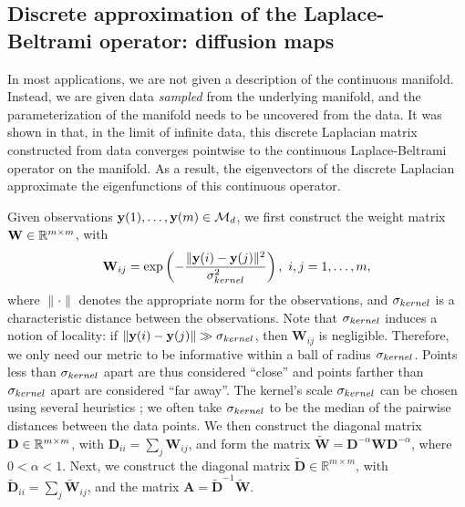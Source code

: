 \subsection{Discrete approximation of the Laplace-Beltrami operator: diffusion maps} \label{sec:dmaps}

In most applications, we are not given a description of the continuous manifold.
%
Instead, we are given data {\em sampled} from the underlying manifold, and the parameterization of the manifold needs to be uncovered from the data.
%
It was shown in \cite{coifman2006geometric} that, in the limit of infinite data, this discrete Laplacian matrix constructed from data converges pointwise to the continuous Laplace-Beltrami operator on the manifold.
%
As a result, the eigenvectors of the discrete Laplacian approximate the eigenfunctions of this continuous operator.

Given observations $\mathbf{y}(1), \dots, \mathbf{y}(m) \in \mathcal{M}_d$, we first construct the weight matrix $\mathbf{W} \in \mathbb{R}^{m \times m}$, with
\begin{equation} \label{eq:W}
\mathbf{W}_{ij} = \exp \left( -\frac{\|\mathbf{y}(i) - \mathbf{y}(j) \|^2}{\sigma_{kernel}^2} \right), \ i,j=1,\ldots,m,
\end{equation}
where $\| \cdot \|$ denotes the appropriate norm for the observations, and $\sigma_{kernel}$ is a characteristic distance between the observations.
%
Note that $\sigma_{kernel}$ induces a notion of locality: if $\|\mathbf{y}(i) - \mathbf{y}(j) \| \gg \sigma_{kernel}$, then $\mathbf{W}_{ij}$ is negligible.
%
Therefore, we only need our metric to be informative within a ball of radius $\sigma_{kernel}$.
%
Points less than $\sigma_{kernel}$ apart are thus considered ``close'' and points farther than $\sigma_{kernel}$ apart are considered ``far away''.
%
The kernel's scale $\sigma_{kernel}$ can be chosen using several heuristics \cite{rohrdanz2011determination, coifman2008graph}; we often take $\sigma_{kernel}$ to be the median of the pairwise distances between the data points.
%
We then construct the diagonal matrix $\mathbf{D} \in \mathbb{R}^{m \times m}$, with $\mathbf{D}_{ii} = \sum_j \mathbf{W}_{ij}$, and form the matrix $\widetilde{\mathbf{W}} = \mathbf{D}^{-\alpha} \mathbf{W} \mathbf{D}^{-\alpha}$, where $0 < \alpha < 1$.
%
Next, we construct the diagonal matrix $\widetilde{\mathbf{D}} \in \mathbb{R}^{m \times m}$, with $\widetilde{\mathbf{D}}_{ii} = \sum_j \widetilde{\mathbf{W}}_{ij}$, and the matrix $\mathbf{A}  = \widetilde{\mathbf{D}}^{-1} \widetilde{\mathbf{W}}.$


